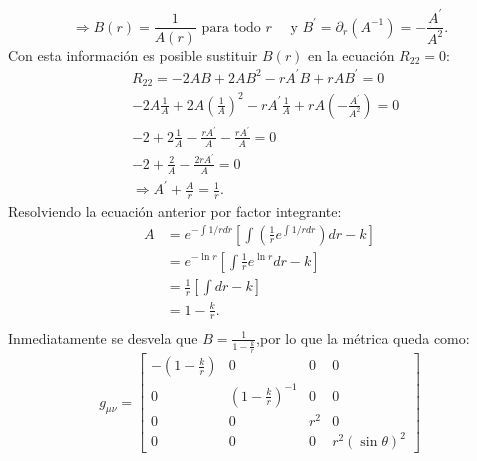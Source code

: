 \begin{equation}
    \Rightarrow B(r)=\frac{1}{A(r)} \text { para todo } r \quad \text { y } B^{\prime}=\partial_r\left(A^{-1}\right)=-\frac{A^{\prime}}{A^2}.
\end{equation}
Con esta información es posible sustituir \( B(r) \) en la ecuación \( R_{22} = 0 \):
\begin{equation}
    \begin{aligned}
         & R_{22}=-2 A B+2 A B^2-r A^{\prime} B+r A B^{\prime}   = 0                                                           \\
         &-2 A \frac{1}{A}+2 A\left(\frac{1}{A}\right)^2-r A^{\prime} \frac{1}{A}+r A\left(-\frac{A^{\prime}}{A^2}\right)=0\\
         & -2 + 2 \frac{1}{A}-\frac{r A^{\prime}}{A}- \frac{r A^{\prime}}{A}=0 \\
            & -2 + \frac{2}{A} - \frac{2r A^{\prime}}{A}=0 \\
            &\Rightarrow  A^{\prime} + \frac{A}{r}=\frac{1}{r}.
    \end{aligned}
    \label{eq:ricci22}
\end{equation}
Resolviendo la ecuación anterior por factor integrante:
\begin{equation}
    \begin{aligned}
        A &= e^{- \int 1/r d r} \left[\int \left(\frac{1}{r}e^{\int 1/r dr } \right)dr - k\right]\\
        &= e^{- \ln r} \left[\int \frac{1}{r} e^{\ln r} dr   - k\right] \\
        &=\frac{1}{r}\left[\int dr - k\right]\\
        &= 1 - \frac{k}{r}. \\
    \end{aligned}
\end{equation}
Inmediatamente se desvela que $B=\frac{1}{1 - \frac{k}{r}}  $,por lo que la métrica queda como:
\begin{equation}
    g_{\mu \nu} =\left[\begin{array}{cccc}
        -\left(1-\frac{k}{r}\right) & 0                                & 0    & 0                   \\
            0             & \left(1-\frac{k}{r}\right)^{-1} & 0    & 0                   \\
            0             & 0                                & r^2 & 0                   \\
            0             & 0                                & 0    & r^2(\sin \theta)^2
        \end{array}\right]
\end{equation}
